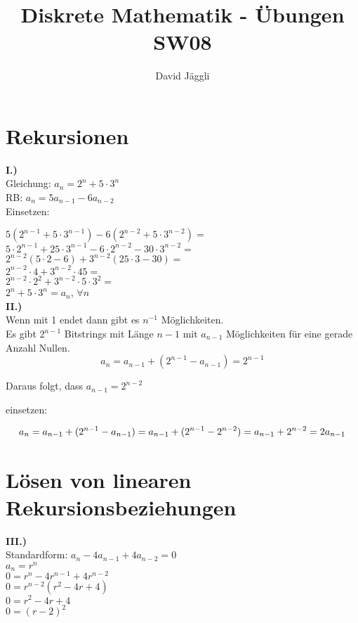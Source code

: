 \documentclass[12pt]{scrartcl}
\author{David Jäggli}
\title{Diskrete Mathematik - Übungen SW08}
\begin{document}
\maketitle

\tableofcontents

\newpage
\section{Rekursionen}
\textbf{I.)}\\
Gleichung: $a_n = 2^n + 5 \cdot 3^n$\\
RB: $a_n = 5a_{n-1} - 6a_{n-2}$\\

Einsetzen:

$5(2^{n-1} + 5 \cdot 3^{n-1}) - 6(2^{n-2} + 5 \cdot 3^{n-2}) = $\\
$5 \cdot 2^{n-1} + 25 \cdot 3^{n-1} - 6 \cdot 2^{n-2} - 30 \cdot 3^{n-2} = $\\
$2^{n-2} (5 \cdot 2 - 6) + 3^{n-2} (25 \cdot 3 - 30) = $\\
$2^{n-2} \cdot 4 + 3^{n-2} \cdot 45 = $\\
$2^{n-2} \cdot 2^2 + 3^{n-2} \cdot 5 \cdot 3^2 = $\\
$2^n + 5 \cdot 3^n = a_n$, $\forall n$\\


\textbf{II.)}\\
Wenn mit 1 endet dann gibt es $n^{-1}$ Möglichkeiten.\\
Es gibt $2^{n-1}$ Bitstrings mit Länge $n-1$ mit $a_{n-1}$ Möglichkeiten für eine gerade Anzahl Nullen.\\

\[a_n = a_{n-1} + (2^{n-1}- a_{n-1}) = 2^{n-1}\]

Daraus folgt, dass $a_{n-1} = 2^{n-2}$

einsetzen: 

\[a_n = a_{n-1} + (2^{n-1}- a_{n-1})\\
= a_{n-1} + (2^{n-1} - 2^{n-2})\\
= a_{n-1} + 2^{n-2}\\
= 2a_{n-1}\]


\section{Lösen von linearen Rekursionsbeziehungen}
\textbf{III.)}\\
Standardform: $a_n - 4a_{n-1} + 4a_{n-2} = 0$\\
$a_n = r^n$\\
$0 = r^n - 4r^{n-1} + 4r^{n-2}$\\
$0 = r^{n-2} (r^2 - 4r + 4)$\\
$0 = r^2 - 4r + 4$\\
$0 = (r-2)^2$\\
\end{document}
